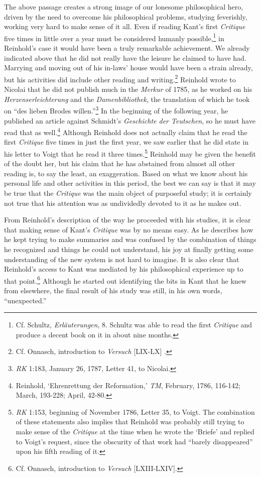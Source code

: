The above passage creates a strong image of our lonesome philosophical hero, driven by the need to overcome his philosophical problems, studying feverishly, working very hard to make sense of it all. Even if reading Kant's first \textit{Critique} five times in little over a year must be considered humanly possible,\footnote{ Cf. Schultz, \textit{Erl\"{a}uterungen}, 8. Schultz was able to read the first \textit{Critique }and produce a decent book on it in about nine months. } in Reinhold's case it would have been a truly remarkable achievement. We already indicated above that he did not really have the leisure he claimed to have had. Marrying and moving out of his in{-}laws' house would have been a strain already, but his activities did include other reading and writing.\footnote{ Cf. Onnasch, introduction to \textit{Versuch }[LIX{-}LX] .} Reinhold wrote to Nicolai that he did not publish much in the \textit{Merkur} of 1785, as he worked on his \textit{Herzenserleichterung} and the \textit{Damenbibliothek}, the translation of which he took on ``des lieben Brodes willen.''\footnote{ \textit{RK} 1:183, January 26, 1787, Letter 41, to Nicolai.} In the beginning of the following year, he published an article against Schmidt's \textit{Geschichte der Teutschen}, so he must have read that as well.\footnote{ Reinhold, `Ehrenrettung der Reformation,' \textit{TM}, February, 1786, 116{-}142; March, 193{-}228; April, 42{-}80.} Although Reinhold does not actually claim that he read the first \textit{Critique} five times in just the first year, we saw earlier that he did state in his letter to Voigt that he read it three times.\footnote{ \textit{RK} 1:153, beginning of November 1786, Letter 35, to Voigt. The combination of these statements also implies that Reinhold was probably still trying to make sense of the \textit{Critique} at the time when he wrote the `Briefe' and replied to Voigt's request, since the obscurity of that work had ``barely disappeared'' upon his fifth reading of it. } Reinhold may be given the benefit of the doubt her, but his claim that he has abstained from almost all other reading is, to say the least, an exaggeration. Based on what we know about his personal life and other activities in this period, the best we can say is that it may be true that the \textit{Critique} was the main object of purposeful study; it is certainly not true that his attention was as undividedly devoted to it as he makes out.

From Reinhold's description of the way he proceeded with his studies, it is clear that making sense of Kant's \textit{Critique} was by no means easy. As he describes how he kept trying to make summaries and was confused by the combination of things he recognized and things he could not understand, his joy at finally getting some understanding of the new system is not hard to imagine. It is also clear that Reinhold's access to Kant was mediated by his philosophical experience up to that point.\footnote{ Cf. Onnasch, introduction to \textit{Versuch} [LXIII{-}LXIV].} Although he started out identifying the bits in Kant that he knew from elsewhere, the final result of his study was still, in his own words, ``unexpected.'' 


